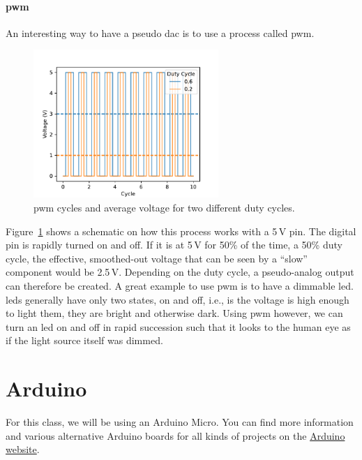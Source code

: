\paragraph{\Ac{pwm}} An interesting way to have a pseudo \ac{dac} is to use a process called \acf{pwm}. 
\begin{figure}[tb]
    \centering
    \includegraphics[width=0.625\textwidth]{graphics/00_introduction/pwm.pdf}
    \caption{\Ac{pwm} cycles and average voltage for two different duty cycles.}
    \label{fig:intro:pwm}
\end{figure}
Figure~\ref{fig:intro:pwm} shows a schematic on how this process works with a 5\,V pin. The digital pin is rapidly turned on and off. If it is at 5\,V for 50\% of the time, a 50\% duty cycle, the effective, smoothed-out voltage that can be seen by a ``slow'' component would be 2.5\,V. Depending on the duty cycle, a pseudo-analog output can therefore be created. A great example to use \ac{pwm} is to have a dimmable \ac{led}. \acp{led} generally have only two states, on and off, i.e., is the voltage is high enough to light them, they are bright and otherwise dark. Using \ac{pwm} however, we can turn an \ac{led} on and off in rapid succession such that it looks to the human eye as if the light source itself was dimmed.


\section{Arduino}

For this class, we will be using an Arduino Micro. You can find more information and various alternative Arduino boards for all kinds of projects on the \href{https://www.arduino.cc}{Arduino website}.

